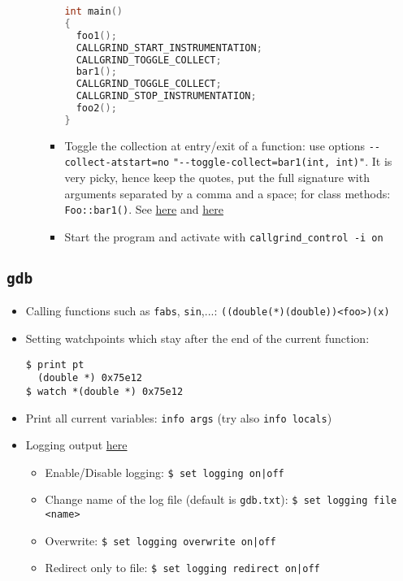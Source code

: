\documentclass[a4paper,12pt,%
              final%
              ]{article}
\begin{document}
\begin{itemize}
\begin{itemize}
\begin{itemize}
\begin{lstlisting}[language=c]
int main()
{
  foo1();
  CALLGRIND_START_INSTRUMENTATION;
  CALLGRIND_TOGGLE_COLLECT;
  bar1();
  CALLGRIND_TOGGLE_COLLECT;
  CALLGRIND_STOP_INSTRUMENTATION;
  foo2();
}
\end{lstlisting}
          \item Toggle the collection at entry/exit of a function: use options \verb|--collect-atstart=no| \verb|"--toggle-collect=bar1(int, int)"|. It is very picky, hence keep the quotes, put the full signature with arguments separated by a comma and a space; for class methods: \verb|Foo::bar1()|. See \href{https://valgrind-users.narkive.com/2YLNcvE8/callgrind-toggle-collect-on-a-class-function}{here} and \href{https://stackoverflow.com/questions/13688185/callgrind-profile-a-specific-part-of-my-code}{here}
          \item Start the program and activate with \verb|callgrind_control -i on|
        \end{itemize}
    \end{itemize}
\end{itemize}

\subsection{\texttt{gdb}}
\label{sec:gdb}
\begin{itemize}
  \item Calling functions such as \texttt{fabs}, \texttt{sin},...: \texttt{((double(*)(double))<foo>)(x)}
  \item Setting watchpoints which stay after the end of the current function:
\begin{verbatim}
$ print pt
  (double *) 0x75e12
$ watch *(double *) 0x75e12
\end{verbatim}
  \item Print all current variables: \texttt{info args} (try also \texttt{info locals})
  \item Logging output \href{https://sourceware.org/gdb/onlinedocs/gdb/Logging-Output.html}{here}
    \begin{itemize}
      \item Enable/Disable logging: \verb!$ set logging on|off!
      \item Change name of the log file (default is \texttt{gdb.txt}): \verb|$ set logging file <name>|
      \item Overwrite: \verb!$ set logging overwrite on|off!
      \item Redirect only to file: \verb!$ set logging redirect on|off!
    \end{itemize}
\end{itemize}
\end{document}
